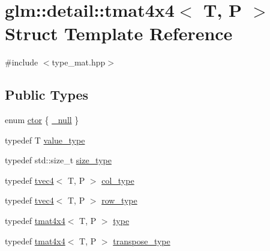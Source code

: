 \hypertarget{structglm_1_1detail_1_1tmat4x4}{}\section{glm\+:\+:detail\+:\+:tmat4x4$<$ T, P $>$ Struct Template Reference}
\label{structglm_1_1detail_1_1tmat4x4}


{\ttfamily \#include $<$type\+\_\+mat.\+hpp$>$}

\subsection*{Public Types}
\begin{DoxyCompactItemize}
\item 
enum \hyperlink{structglm_1_1detail_1_1tmat4x4_a314ae2df1758ddf97e2b024c32649cef}{ctor} \{ \hyperlink{structglm_1_1detail_1_1tmat4x4_a314ae2df1758ddf97e2b024c32649cefa16fafd8cae6a9c69210c2e073c03edf0}{\+\_\+null}
 \}
\item 
typedef T \hyperlink{structglm_1_1detail_1_1tmat4x4_adce6da39b62e447be40eaa843bc774e3}{value\+\_\+type}
\item 
typedef std\+::size\+\_\+t \hyperlink{structglm_1_1detail_1_1tmat4x4_a902f3edef1874ef653562bdd9947fcf9}{size\+\_\+type}
\item 
typedef \hyperlink{structglm_1_1detail_1_1tvec4}{tvec4}$<$ T, P $>$ \hyperlink{structglm_1_1detail_1_1tmat4x4_ade9e794ddd9c2758005f29ddb84e320f}{col\+\_\+type}
\item 
typedef \hyperlink{structglm_1_1detail_1_1tvec4}{tvec4}$<$ T, P $>$ \hyperlink{structglm_1_1detail_1_1tmat4x4_a5db91d0e5acad7201a6624c595bcb462}{row\+\_\+type}
\item 
typedef \hyperlink{structglm_1_1detail_1_1tmat4x4}{tmat4x4}$<$ T, P $>$ \hyperlink{structglm_1_1detail_1_1tmat4x4_a692f6b423a90288bd4043a6c447f7864}{type}
\item 
typedef \hyperlink{structglm_1_1detail_1_1tmat4x4}{tmat4x4}$<$ T, P $>$ \hyperlink{structglm_1_1detail_1_1tmat4x4_a92072726f44cd765df13235e7a1c45a8}{transpose\+\_\+type}
\end{DoxyCompactItemize}
